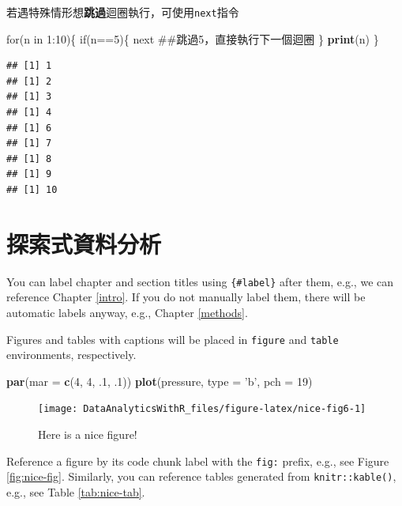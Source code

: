 \documentclass[]{book}
\newenvironment{Shaded}{\begin{snugshade}}{\end{snugshade}}
\newcommand{\KeywordTok}[1]{\textcolor[rgb]{0.13,0.29,0.53}{\textbf{{#1}}}}
\newcommand{\DataTypeTok}[1]{\textcolor[rgb]{0.13,0.29,0.53}{{#1}}}
\newcommand{\DecValTok}[1]{\textcolor[rgb]{0.00,0.00,0.81}{{#1}}}
\newcommand{\StringTok}[1]{\textcolor[rgb]{0.31,0.60,0.02}{{#1}}}
\newcommand{\NormalTok}[1]{{#1}}
\theoremstyle{definition}
\theoremstyle{definition}
\theoremstyle{remark}
\begin{document}
若遇特殊情形想\textbf{跳過}迴圈執行，可使用\texttt{next}指令

\begin{Shaded}
\begin{Highlighting}[]
\NormalTok{for(n in }\DecValTok{1}\NormalTok{:}\DecValTok{10}\NormalTok{)\{}
  \NormalTok{if(n==}\DecValTok{5}\NormalTok{)\{}
    \NormalTok{next ##跳過5，直接執行下一個迴圈}
  \NormalTok{\}}
  \KeywordTok{print}\NormalTok{(n)}
\NormalTok{\}}
\end{Highlighting}
\end{Shaded}

\begin{verbatim}
## [1] 1
## [1] 2
## [1] 3
## [1] 4
## [1] 6
## [1] 7
## [1] 8
## [1] 9
## [1] 10
\end{verbatim}

\chapter{探索式資料分析}\label{eda}

You can label chapter and section titles using \texttt{\{\#label\}}
after them, e.g., we can reference Chapter \ref{intro}. If you do not
manually label them, there will be automatic labels anyway, e.g.,
Chapter \ref{methods}.

Figures and tables with captions will be placed in \texttt{figure} and
\texttt{table} environments, respectively.

\begin{Shaded}
\begin{Highlighting}[]
\KeywordTok{par}\NormalTok{(}\DataTypeTok{mar =} \KeywordTok{c}\NormalTok{(}\DecValTok{4}\NormalTok{, }\DecValTok{4}\NormalTok{, .}\DecValTok{1}\NormalTok{, .}\DecValTok{1}\NormalTok{))}
\KeywordTok{plot}\NormalTok{(pressure, }\DataTypeTok{type =} \StringTok{'b'}\NormalTok{, }\DataTypeTok{pch =} \DecValTok{19}\NormalTok{)}
\end{Highlighting}
\end{Shaded}

\begin{figure}

{\centering \texttt{[image: DataAnalyticsWithR\_files/figure-latex/nice-fig6-1]} 

}

\caption{Here is a nice figure!}\label{fig:nice-fig6}
\end{figure}

Reference a figure by its code chunk label with the \texttt{fig:}
prefix, e.g., see Figure \ref{fig:nice-fig}. Similarly, you can
reference tables generated from \texttt{knitr::kable()}, e.g., see Table
\ref{tab:nice-tab}.
\end{document}
